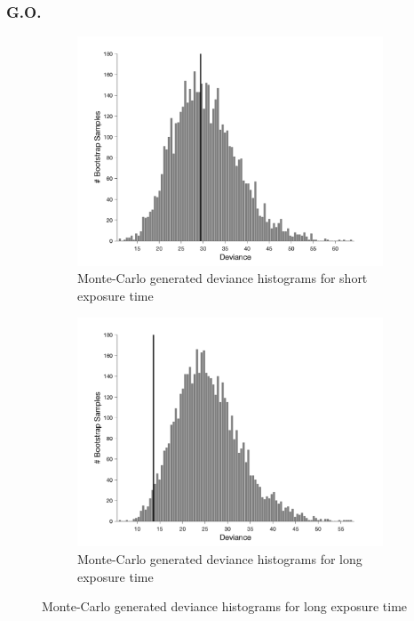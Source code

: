 \documentclass{article}
\begin{document}
\subsubsection*{G.O.}
\begin{figure}[!hb]
    \begin{subfigure}{0.494\textwidth}
        \centering
        \includegraphics[width = \linewidth]{Thesis/plots/gof/segSize/segSize_go_short_bootstrap.png}
        \caption{Monte-Carlo generated deviance histograms for short exposure time}
        \label{fig:da_gof_short_bootstrap}
    \end{subfigure}
    \hspace{0.01\textwidth}
    \begin{subfigure}{0.494\textwidth}
        \centering
        \includegraphics[width = \linewidth]{Thesis/plots/gof/segSize/segSize_go_long_bootstrap.png}
        \caption{Monte-Carlo generated deviance histograms for long exposure time}
        \label{fig:da_gof_long_bootstrap}
    \end{subfigure}
    

\end{figure}
\end{document}

